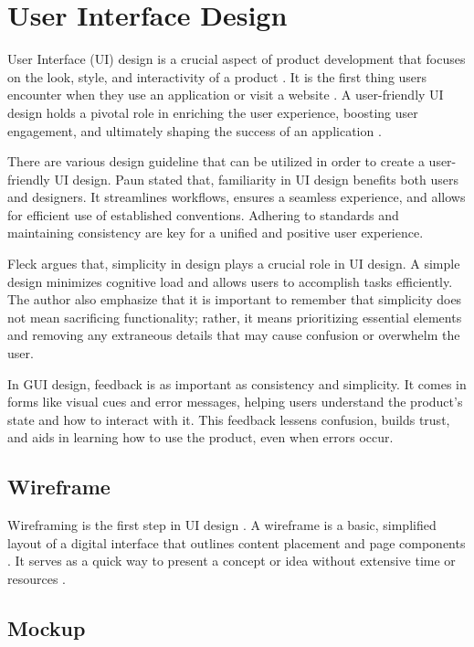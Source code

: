 \section{User Interface Design}
User Interface (UI) design is a crucial aspect of product development that focuses on the look, style, and interactivity of a product \cite{Coursera_2023}. It is the first thing users encounter when they use an application or visit a website \cite{Coursera_2023}.
A user-friendly UI design holds a pivotal role in enriching the user experience, boosting user engagement, and ultimately shaping the success of an application \cite{AlgoRepublic_2023}.

There are various design guideline that can be utilized in order to create a user-friendly UI design. Paun \cite{Paun_2020} stated that, familiarity in UI design benefits both users and designers. It streamlines workflows, ensures a seamless experience, and allows for efficient use of established conventions. Adhering to standards and maintaining consistency are key for a unified and positive user experience.

Fleck \cite{Fleck_2021} argues that, simplicity in design plays a crucial role in UI design.  A simple design minimizes cognitive load and allows users to accomplish tasks efficiently. The author also emphasize that it is important to remember that simplicity does not mean sacrificing functionality; rather, it means prioritizing essential elements and removing any extraneous details that may cause confusion or overwhelm the user.

In GUI design, feedback is as important as consistency and simplicity. It comes in forms like visual cues and error messages, helping users understand the product's state and how to interact with it. This feedback lessens confusion, builds trust, and aids in learning how to use the product, even when errors occur. \cite{Florido_2022}

\subsection{Wireframe}
\label{subsec:wireframe}

Wireframing is the first step in UI design \cite{Gupta_2023}. A wireframe is a basic, simplified layout of a digital interface that outlines content placement and page components \cite{White_2023}. It serves as a quick way to present a concept or idea without extensive time or resources \cite{White_2023}.

\subsection{Mockup}

